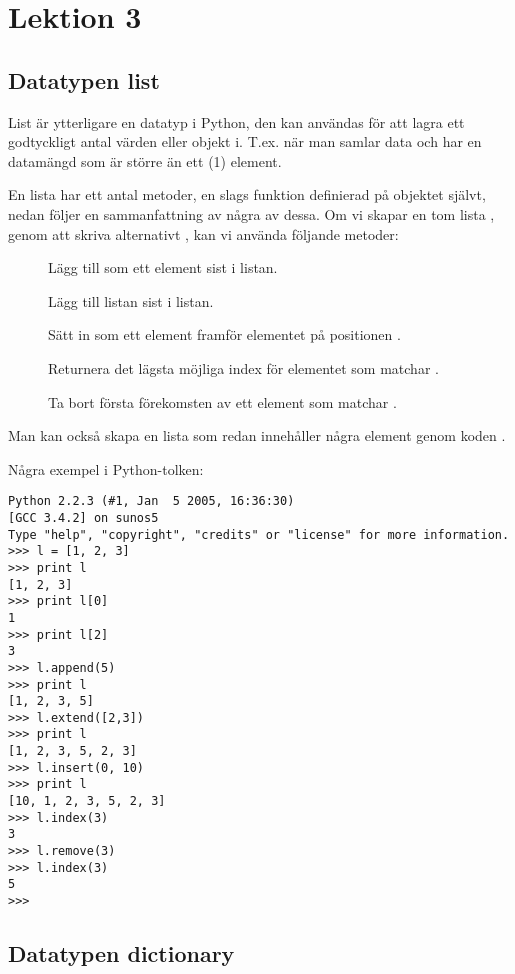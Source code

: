 \chapter{Lektion 3}

\section{Datatypen list}

List är ytterligare en datatyp i Python, den kan användas för att lagra ett
godtyckligt antal värden eller objekt i. T.ex. när man samlar data och har en
datamängd som är större än ett (1) element.

En lista har ett antal metoder, en slags funktion definierad på objektet
självt, nedan följer en sammanfattning av några av dessa. Om vi skapar en tom
lista , genom att skriva  alternativt ,
kan vi använda följande metoder:

\begin{description}
\item[] Lägg till  som ett element sist i listan.
\item[] Lägg till listan  sist i listan.
\item[] Sätt in  som ett element framför elementet
	på positionen .
\item[] Returnera det lägsta möjliga index för elementet som
	matchar .
\item[] Ta bort första förekomsten av ett element som matchar
	.
\end{description}

Man kan också skapa en lista som redan innehåller några element genom koden
.

Några exempel i Python-tolken:
\begin{lstlisting}[style=text]
Python 2.2.3 (#1, Jan  5 2005, 16:36:30)
[GCC 3.4.2] on sunos5
Type "help", "copyright", "credits" or "license" for more information.
>>> l = [1, 2, 3]
>>> print l
[1, 2, 3]
>>> print l[0]
1
>>> print l[2]
3
>>> l.append(5)
>>> print l
[1, 2, 3, 5]
>>> l.extend([2,3])
>>> print l
[1, 2, 3, 5, 2, 3]
>>> l.insert(0, 10)
>>> print l
[10, 1, 2, 3, 5, 2, 3]
>>> l.index(3)
3
>>> l.remove(3)
>>> l.index(3)
5
>>>
\end{lstlisting}



\section{Datatypen dictionary}

